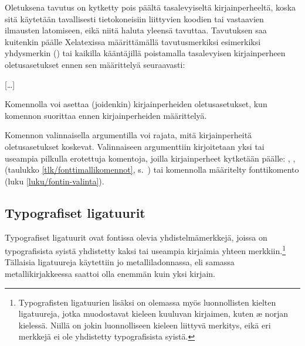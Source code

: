 Oletuksena tavutus on kytketty pois päältä tasalevyiseltä
kirjainperheeltä, koska sitä käytetään tavallisesti tietokoneisiin
liittyvien koodien tai vastaavien ilmausten latomiseen, eikä niitä
haluta yleensä tavuttaa. Tavutuksen saa kuitenkin päälle Xelatexissa
määrittämällä tavutusmerkiksi esimerkiksi yhdysmerkin
() tai kaikilla kääntäjillä poistamalla
tasalevyisen kirjainperheen oletusasetukset ennen sen määrittelyä
seuraavasti:

\begin{koodilohkosis}
\setmonofont{…}[…]
\end{koodilohkosis}

\noindent
Komennolla  voi asettaa (joidenkin)
kirjainperheiden oletusasetukset, kun komennon suorittaa ennen
kirjainperheiden määrittelyä.

\begin{koodilohkosis}
\end{koodilohkosis}

\noindent
Komennon valinnaisella argumentilla voi rajata, mitä kirjainperheitä
oletusasetukset koskevat. Valinnaiseen argumenttiin kirjoitetaan yksi
tai useampia pilkulla erotettuja komentoja, joilla kirjainperheet
kytketään päälle: , ,
 (taulukko \ref{tlk/fonttimallikomennot},
s.~\pageref{tlk/fonttimallikomennot}) tai komennolla
 määritelty fonttikomento (luku
\ref{luku/fontin-valinta}).

\subsection{Typografiset ligatuurit}
\label{luku/typo-liga}

Typografiset ligatuurit ovat fontissa olevia yhdistelmämerkkejä, joissa
on typografisista syistä yhdistetty kaksi tai useampia kirjaimia yhteen
merkkiin.\footnote{Typografisten ligatuurien lisäksi on olemassa myös
  luonnollisten kielten ligatuureja, jotka muodostavat kieleen kuuluvan
  kirjaimen, kuten æ norjan kielessä. Niillä on jokin luonnolliseen
  kieleen liittyvä merkitys, eikä eri merkkejä ei ole yhdistetty
  typografisista syistä.} Tällaisia ligatuureja käytettiin jo
metalliladonnassa, eli samassa metallikirjakkeessa saattoi olla enemmän
kuin yksi kirjain.

